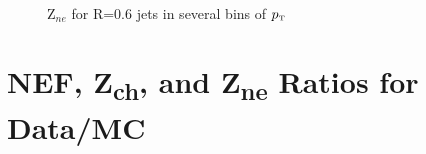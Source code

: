 \documentclass[ALICE]{ALICE_analysis_notes}
\newcommand{\pT}{$p_{\mbox{\tiny T}}$\xspace}
\providecommand{\DIFaddtex}[1]{{\protect\color{blue}\uwave{#1}}} %
\providecommand{\DIFaddbegin}{} %
\providecommand{\DIFaddend}{} %
\providecommand{\DIFadd}[1]{\texorpdfstring{\DIFaddtex{#1}}{#1}} %
\newcommand{\DIFaddincludegraphics}[2][]{{\color{blue}\fbox{\DIFOincludegraphics[#1]{#2}}}} %
\DeclareRobustCommand{\DIFaddbegin}{\DIFOaddbegin \let\includegraphics\DIFaddincludegraphics} %
\DeclareRobustCommand{\DIFaddend}{\DIFOaddend \let\includegraphics\DIFOincludegraphics} %
\begin{document}
\begin{appendix}
\begin{figure}[h!]
    \\
    \caption{Z$_{ne}$ for R=0.6 jets in several bins of \pT}
    \label{fig:TriggerBiasZneR06}
\end{figure}

\newpage

\section{NEF, \texorpdfstring{Z\textsubscript{ch}}{Zch}, and \texorpdfstring{Z\textsubscript{ne}}{Zne} Ratios for Data/MC \DIFaddbegin \DIFadd{-- pp}\DIFaddend }
\label{sec:appendixTriggerBiasRatios}



\end{appendix}
\end{document}
